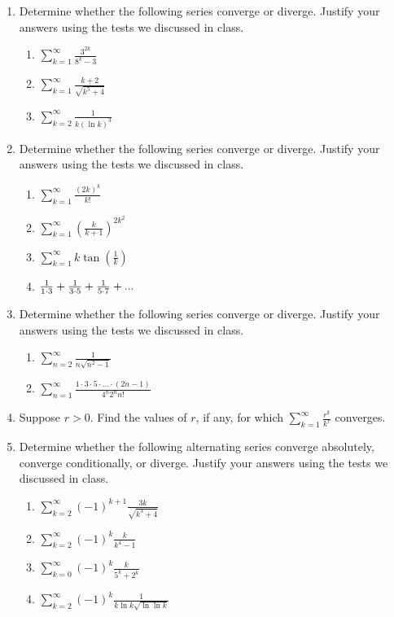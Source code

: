 \documentclass[12pt]{article}
\begin{document}
\begin{enumerate}
\item Determine whether the following series converge or 
diverge.  Justify your answers using the tests we discussed in class.

\begin{enumerate}
\item  $\sum_{k=1}^{\infty} {\frac{3^{2k}}{8^k - 3}}$
\medskip
\item $\sum_{k=1}^{\infty} {\frac{k+2}{\sqrt{k^5 + 4}}}$
\medskip
\item $\sum_{k=2}^{\infty} {\frac{1}{k (\ln k)^3}}$
\end{enumerate}
\medskip
\item 
Determine whether the following series converge or diverge.  Justify your answers using the tests we discussed in class.

\begin{enumerate}
\item  $\sum_{k=1}^{\infty} {\frac{(2k)^k}{k!}}$
\medskip
\item $\sum_{k=1}^{\infty} \left ( {\frac{k}{k+1}} \right )^{2k^2}$
\medskip
\item $\sum_{k=1}^{\infty} k \tan \left ( {\frac{1}{k}} \right )$
\medskip
\item ${\frac{1}{1 \cdot 3}} + {{1}\over{3 \cdot 5}} + 
{\frac{1}{5 \cdot 7}} + ...$
\medskip 
\end{enumerate}

\item Determine whether the following series converge or 
diverge.  Justify your answers using the tests we discussed in class.

\begin{enumerate}
\item  $\sum_{n=2}^{\infty} {\frac{1}{n \sqrt{n^2-1}}}$
\medskip
\item $\sum_{n=1}^{\infty} {\frac{1 \cdot 3 \cdot 5 \cdot ... \cdot 
(2n-1)}{4^n 2^n n!}}$
\medskip
\end{enumerate}

\item Suppose $r > 0$.  Find the values of $r$, if any, 
for which $\sum_{k=1}^{\infty} {\frac{r^k}{k^r}}$ converges.
\medskip

\item Determine whether the following alternating series
converge absolutely, converge conditionally, or diverge.  Justify your
answers using the tests we discussed in class.

\begin{enumerate}
\item  $\sum_{k=2}^{\infty} (-1)^{k+1} {\frac{3k}{\sqrt{k^3+4}}}$
\medskip
\item $\sum_{k=2}^{\infty} (-1)^k {\frac{k}{k^4-1}}$
\medskip
\item  $\sum_{k=0}^{\infty} (-1)^{k} {\frac{k}{5^k+2^k}}$
\medskip
\item $\sum_{k=2}^{\infty} (-1)^k {\frac{1}{k \ln k \sqrt{\ln \ln k}}}$ 
\medskip 
\end{enumerate}


\end{enumerate}
\end{document}
